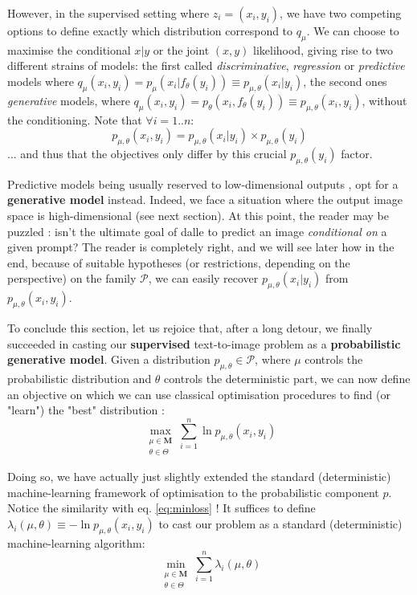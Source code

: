 \documentclass{article}
\begin{document}
\begin{multicols}{2}
However, in the supervised setting where $z_i=(x_i,y_i)$, we have two competing options to define exactly which distribution correspond to $q_\mu$. We can choose to maximise the conditional $x|y$ or the joint $(x,y)$ likelihood, giving rise to two different strains of models: the first called \textit{discriminative}, \textit{regression} or \textit{predictive} models where  $q_\mu(x_i,y_i)=p_{\mu}(x_i|f_\theta(y_i))\equiv p_{\mu,\theta}(x_i|y_i)$, the second ones \textit{generative} models, where $q_\mu(x_i,y_i)=p_\theta(x_i, f_\theta(y_i))\equiv p_{\mu,\theta}(x_i,y_i)$, without the conditioning. Note that $\forall i=1..n$: $$p_{\mu,\theta}(x_i, y_i)=p_{\mu,\theta}(x_i|y_i) \times p_{\mu,\theta}(y_i)$$ ... and thus that the objectives only differ by this crucial $p_{\mu,\theta}(y_i)$ factor.

Predictive models being usually reserved to low-dimensional outputs \citep{probml-advanced}, \cite{zeroshot} opt for a \textbf{generative model} instead. Indeed, we face a situation where the output image space is high-dimensional (see next section). At this point, the reader may be puzzled : isn't the ultimate goal of \gls{dalle} to predict an image \textit{conditional on} a given prompt? The reader is completely right, and we will see later how in the end, because of suitable hypotheses (or restrictions, depending on the perspective) on the family $\mathcal{P}$, we can easily recover $p_{\mu,\theta}(x_i|y_i)$ from $p_{\mu,\theta}(x_i,y_i)$.

To conclude this section, let us rejoice that, after a long detour, we finally succeeded in casting our \textbf{supervised} text-to-image problem as a \textbf{probabilistic generative model}. Given a distribution $p_{\mu,\theta}\in\mathcal{P}$, where $\mu$ controls the probabilistic distribution and $\theta$ controls the deterministic part, we can now define an objective on which we can use classical optimisation procedures to find (or "learn") the "best" distribution :
$$\max_{\substack{\mu\in\mathbf{M}\\\theta \in \Theta}} \sum_{i=1}^n \ln p_{\mu,\theta}(x_i,y_i)$$

Doing so, we have actually just slightly extended the standard (deterministic) machine-learning framework of optimisation to the probabilistic component $p$. Notice the similarity with eq. \ref{eq:minloss} ! It suffices to define $\lambda_i(\mu,\theta)\equiv - \ln p_{\mu,\theta}(x_i,y_i)$ to cast our problem as a standard (deterministic) machine-learning algorithm:
$$\min_{\substack{\mu\in\mathbf{M}\\\theta \in \Theta}} \sum_{i=1}^n \lambda_i(\mu,\theta)$$


\end{multicols}
\end{document}
